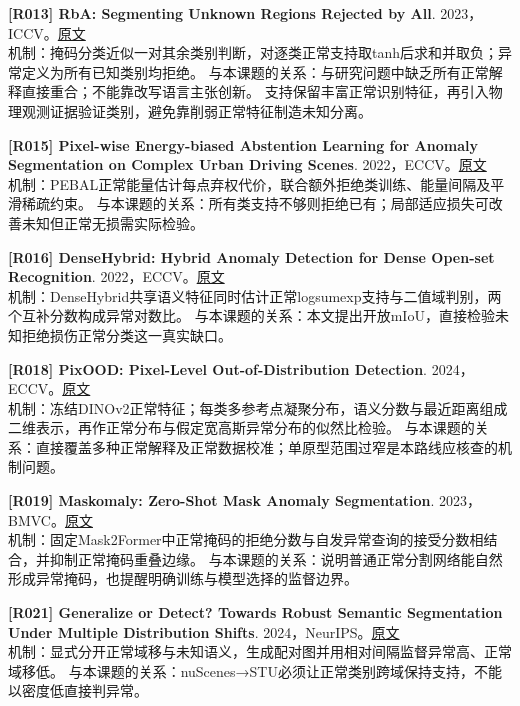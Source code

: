 \documentclass[11pt,a4paper]{article}
\begin{document}
\hypertarget{R013}{}\textbf{[R013] RbA: Segmenting Unknown Regions Rejected by All}. 2023，ICCV。\href{https://arxiv.org/html/2211.14293}{原文}\\
机制：掩码分类近似一对其余类别判断，对逐类正常支持取tanh后求和并取负；异常定义为所有已知类别均拒绝。 与本课题的关系：与研究问题中缺乏所有正常解释直接重合；不能靠改写语言主张创新。 支持保留丰富正常识别特征，再引入物理观测证据验证类别，避免靠削弱正常特征制造未知分离。\par\medskip
\hypertarget{R015}{}\textbf{[R015] Pixel-wise Energy-biased Abstention Learning for Anomaly Segmentation on Complex Urban Driving Scenes}. 2022，ECCV。\href{https://arxiv.org/html/2111.12264}{原文}\\
机制：PEBAL正常能量估计每点弃权代价，联合额外拒绝类训练、能量间隔及平滑稀疏约束。 与本课题的关系：所有类支持不够则拒绝已有；局部适应损失可改善未知但正常无损需实际检验。\par\medskip
\hypertarget{R016}{}\textbf{[R016] DenseHybrid: Hybrid Anomaly Detection for Dense Open-set Recognition}. 2022，ECCV。\href{https://arxiv.org/html/2207.02606}{原文}\\
机制：DenseHybrid共享语义特征同时估计正常logsumexp支持与二值域判别，两个互补分数构成异常对数比。 与本课题的关系：本文提出开放mIoU，直接检验未知拒绝损伤正常分类这一真实缺口。\par\medskip
\hypertarget{R018}{}\textbf{[R018] PixOOD: Pixel-Level Out-of-Distribution Detection}. 2024，ECCV。\href{https://www.ecva.net/papers/eccv_2024/papers_ECCV/papers/07720.pdf}{原文}\\
机制：冻结DINOv2正常特征；每类多参考点凝聚分布，语义分数与最近距离组成二维表示，再作正常分布与假定宽高斯异常分布的似然比检验。 与本课题的关系：直接覆盖多种正常解释及正常数据校准；单原型范围过窄是本路线应核查的机制问题。\par\medskip
\hypertarget{R019}{}\textbf{[R019] Maskomaly: Zero-Shot Mask Anomaly Segmentation}. 2023，BMVC。\href{https://arxiv.org/html/2305.16972}{原文}\\
机制：固定Mask2Former中正常掩码的拒绝分数与自发异常查询的接受分数相结合，并抑制正常掩码重叠边缘。 与本课题的关系：说明普通正常分割网络能自然形成异常掩码，也提醒明确训练与模型选择的监督边界。\par\medskip
\hypertarget{R021}{}\textbf{[R021] Generalize or Detect? Towards Robust Semantic Segmentation Under Multiple Distribution Shifts}. 2024，NeurIPS。\href{https://arxiv.org/html/2411.03829}{原文}\\
机制：显式分开正常域移与未知语义，生成配对图并用相对间隔监督异常高、正常域移低。 与本课题的关系：nuScenes→STU必须让正常类别跨域保持支持，不能以密度低直接判异常。\par\medskip
\end{document}

